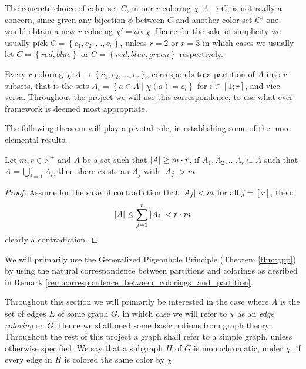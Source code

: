 \begin{remark}\label{rem:color_sets}
The concrete choice of color set $C$, in our $r$-coloring $\chi: A \to C$, is not really a concern, since given any bijection $\phi$ between $C$ and another color set $C'$ one would obtain a new $r$-coloring $\chi' = \phi \circ \chi$.
Hence for the sake of simplicity we usually pick $C = \left\{c_1, c_2, \ldots, c_{r}\right\}$, unless $r = 2$ or $r = 3$ in which cases we usually let $C = \left\{red, blue\right\}$ or $C = \left\{red, blue, green\right\}$ respectively.
\end{remark}
\begin{remark}\label{rem:correspondence_between_colorings_and_partition}
	Every $r$-coloring $\chi: A \to \left\{c_1, c_2, \ldots, c_{r}\right\}$, corresponds to a partition of $A$ into $r$-subsets, that is the sets $A_{i} = \left\{a \in A \middle| \chi(a) = c_{i}\right\}$ for $i \in [1; r]$, and vice versa. Throughout the project we will use this correspondence, to use what ever framework is deemed most appropriate.
\end{remark}
The following theorem will play a pivotal role, in establishing some of the more elemental results.
\begin{theorem}\label{thm:gpp}
	Let $m, r \in \mathbb{N}^{+}$ and $A$ be a set such that $\left\lvert A\right\rvert \geq m \cdot r$, if $A_1, A_2, \ldots A_r \subseteq A$ such that $A = \bigcup_{i = 1}^{r} A_i$, then there exists an $A_j$ with $\left\lvert A_j\right\rvert > m$.
\end{theorem}
\begin{proof}
	Assume for the sake of contradiction that $\left\lvert A_j\right\rvert < m$ for all $j = [r]$, then:
	\begin{equation*}
		\left\lvert A\right\rvert \leq \sum_{j = 1}^r \left\lvert A_i\right\rvert < r \cdot m
	\end{equation*}
	clearly a contradiction.
\end{proof}
We will primarily use the Generalized Pigeonhole Principle (Theorem \ref{thm:gpp}) by using the natural correspondence between partitions and colorings as desribed in Remark \ref{rem:correspondence_between_colorings_and_partition}.

Throughout this section we will primarily be interested in the case where $A$ is the set of edges $E$ of some graph $G$, in which case we will refer to $\chi$ as an \textit{edge coloring} on $G$.
Hence we shall need some basic notions from graph theory. Throughout the rest of this project a graph shall refer to a simple graph, unless otherwise specified. We say that a subgraph $H$ of $G$ is monochromatic, under $\chi$, if every edge in $H$ is colored the same color by $\chi$

